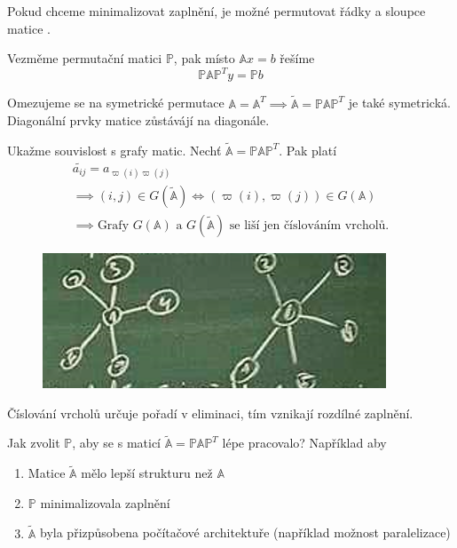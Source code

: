 \documentclass[../main.tex]{subfiles}
\begin{document}
Pokud chceme minimalizovat zaplnění, je možné permutovat řádky a sloupce matice \matA.

Vezměme permutační matici $\mathbb{P}$, pak místo $\mathbb{A}x=b$
řešíme \begin{equation*}
    \mathbb{P}\mathbb{A}\mathbb{P}^T y = \mathbb{P} b 
\end{equation*}


Omezujeme se na symetrické permutace
$\mathbb{A}=\mathbb{A}^T \implies \tilde{\mathbb{A}}= \mathbb{P}\mathbb{A}\mathbb{P}^T$ je také symetrická.
Diagonální prvky matice \matA zůstávájí na diagonále.

Ukažme souvislost s grafy matic. Nechť $\tilde{\mathbb{A}}= \mathbb{P}\mathbb{A}\mathbb{P}^T$. Pak platí
\begin{multline*}
    \tilde{a_{ij}} = a_{\varpi(i)\varpi(j)}\\
    \implies  (i,j)\in G(\tilde{\mathbb{A}}) \Leftrightarrow (\varpi(i), \varpi(j))\in G(\mathbb{A})\\
    \implies \text{Grafy } G(\mathbb{A}) \text{ a } G(\tilde{\mathbb{A}}) \text{ se liší jen číslováním vrcholů.} 
\end{multline*}

\begin{figure}[H]
    \centering
    \includegraphics{images/26-10-cislovani.png}
\end{figure}
 Číslování vrcholů určuje pořadí v eliminaci, tím vznikají rozdílné zaplnění.



Jak zvolit $\mathbb{P}$, aby se s maticí 
$\tilde{\mathbb{A}}= \mathbb{P}\mathbb{A}\mathbb{P}^T$
lépe pracovalo? Například aby 
\begin{enumerate}
    \item Matice $\tilde{\mathbb{A}}$ mělo lepší strukturu než $\mathbb{A}$
    \item $\mathbb{P}$ minimalizovala zaplnění
    \item $\tilde{\mathbb{A}}$ byla přizpůsobena počítačové architektuře (například možnost paralelizace)
\end{enumerate}
\end{document}

